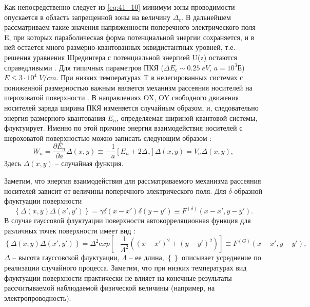 Как непосредственно следует из \eqref{eq:41_10} минимум зоны проводимости опускается в область запрещенной зоны на величину $\Delta _{c} $. В дальнейшем рассматриваем такие значения напряженности поперечного электрического поля E, при которых параболическая форма потенциальной энергии сохраняется, и в ней остается много размерно-квантованных эквидистантных уровней, т.е. решения уравнения Шредингера с потенциальной энергией U(z) остаются справедливыми \cite{Kanarovskii1995}. Для типичных параметров ПКЯ ($\Delta E_{c} \sim 0.25{\mathrm \; eV}$, $a=10^{3} $Е) $E\le 3\cdot 10^{4} {\mathrm \; V/cm}$. При низких температурах T в нелегированных системах с пониженной размерностью важным является механизм рассеяния носителей на шероховатой поверхности \cite{Sakaki1987,Vurgaftman1999}. В направлениях OX, OY свободного движения носителей заряда ширина ПКЯ изменяется случайным образом, и, следовательно энергия размерного квантования $E_{n} $, определяемая шириной квантовой системы, флуктуирует. Именно по этой причине энергия взаимодействия носителей с шероховатой поверхностью можно записать следующим образом \cite{Sakaki1987}:
\begin{equation} \label{eq:41_20}
W_{n} =\frac{\partial E_{n} }{\partial a} \Delta (x,y)\equiv -\frac{1}{a} \left[E_{n} +2\Delta _{c} \right]\Delta (x,y)=V_{n} \Delta (x,y),
\end{equation}
Здесь $\Delta (x,y)$ -- случайная функция.

Заметим, что энергия взаимодействия для рассматриваемого механизма рассеяния носителей зависит от величины поперечного электрического поля. Для $\delta $-образной флуктуации поверхности
\begin{equation} \label{eq:41_30}
\left\{\Delta (x,y)\Delta (x',y')\right\}=\gamma \delta (x-x')\delta (y-y')\equiv F^{(\delta )} \left(x-x',y-y'\right).
\end{equation} 
В случае гауссовой флуктуации поверхности автокорреляционная функция для различных точек поверхности имеет вид \cite{Sakaki1987}:
\begin{equation} \label{eq:41_40}
\left\{\Delta (x,y)\Delta (x',y')\right\}=\Delta ^{2} {\mathrm exp}\left[-\frac{1}{\Lambda ^{2} } \left((x-x')^{2} +(y-y')^{2} \right)\right]\equiv F^{(G)} \left(x-x',y-y'\right),
\end{equation} 
$\Delta $ -- высота гауссовской флуктуации, $\Lambda $ -- ее длина, $\left\{\right\}$ описывает усреднение по реализации случайного процесса. Заметим, что при низких температурах вид флуктуации поверхности практически не влияет на конечные результаты рассчитываемой наблюдаемой физической величины (например, на электропроводность).

